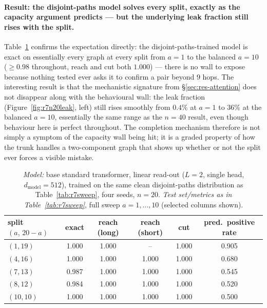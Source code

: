 \documentclass[11pt,a4paper]{article}
\begin{document}
\paragraph{Result: the disjoint-paths model solves every split, exactly as the capacity
argument predicts --- but the underlying leak fraction still rises with the split.}
Table~\ref{tab:r7n20sweep} confirms the expectation directly: the disjoint-paths-trained
model is exact on essentially every graph at every split from $a=1$ to the balanced
$a=10$ ($\ge0.98$ throughout, reach and cut both $1.000$) --- there is no wall to expose
because nothing tested ever asks it to confirm a pair beyond $9$ hops. The interesting result
is that the mechanistic signature from \S\ref{sec:res-attention} does not disappear along
with the behavioural wall: the leak fraction (Figure~\ref{fig:r7n20leak}, left) still rises
smoothly from $0.4\%$ at $a=1$ to $36\%$ at the balanced $a=10$, essentially the same range as
the $n=40$ result, even though behaviour here is perfect throughout. The completion mechanism
therefore is not simply a symptom of the capacity wall being hit; it is a graded property of
how the trunk handles a two-component graph that shows up whether or not the split ever
forces a visible mistake.

\begin{table}[H]\centering\small
\begin{tabular}{lccccc}
\toprule
split $(a,\,20{-}a)$ & exact & reach (long) & reach (short) & cut & pred.\ positive rate\\
\midrule
$(1,19)$  & 1.000 & 1.000 & --    & 1.000 & 0.905\\
$(4,16)$  & 1.000 & 1.000 & 1.000 & 1.000 & 0.680\\
$(7,13)$  & 0.987 & 1.000 & 1.000 & 1.000 & 0.545\\
$(8,12)$  & 0.984 & 1.000 & 1.000 & 1.000 & 0.520\\
$(10,10)$ & 1.000 & 1.000 & 1.000 & 1.000 & 0.500\\
\bottomrule\end{tabular}
\caption{\emph{Model:} base standard transformer, linear read-out ($L=2$, single head,
$d_{\mathrm{model}}=512$), trained on the same clean disjoint-paths distribution as
Table~\ref{tab:r7sweep}, four seeds, $n=20$. \emph{Test set/metrics as in
Table~\ref{tab:r7sweep}}, full sweep $a=1,\dots,10$ (selected columns shown).}
\label{tab:r7n20sweep}
\end{table}
\end{document}
